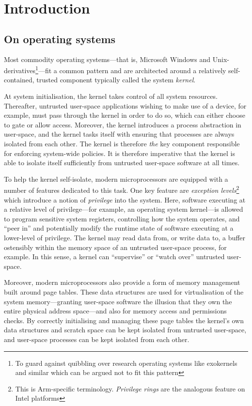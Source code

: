 \documentclass[a4paper, UKenglish, cleveref, autoref, thm-restate]{lipics-v2021}
\begin{document}
\section{Introduction}
\label{sect.introduction}

\subsection{On operating systems}

Most commodity operating systems---that is, Microsoft Windows and Unix-derivatives\footnote{To guard against quibbling over research operating systems like exokernels and similar which can be argued not to fit this pattern}---fit a common pattern and are architected around a relatively self-contained, trusted component typically called the system \emph{kernel}.

At system initialisation, the kernel takes control of all system resources.
Thereafter, untrusted user-space applications wishing to make use of a device, for example, must pass through the kernel in order to do so, which can either choose to gate or allow access.
Moreover, the kernel introduces a process abstraction in user-space, and the kernel tasks itself with ensuring that processes are always isolated from each other.
The kernel is therefore \emph{the} key component responsible for enforcing system-wide policies.
It is therefore imperative that the kernel is able to isolate itself sufficiently from untrusted user-space software at all times.

To help the kernel self-isolate, modern microprocessors are equipped with a number of features dedicated to this task.
One key feature are \emph{exception levels}\footnote{This is Arm-specific terminology.  \emph{Privilege rings} are the analogous feature on Intel platforms} which introduce a notion of \emph{privilege} into the system.
Here, software executing at a relative level of privilege---for example, an operating system kernel---is allowed to program sensitive system registers, controlling how the system operates, and ``peer in'' and potentially modify the runtime state of software executing at a lower-level of privilege.
The kernel may read data from, or write data to, a buffer ostensibly within the memory space of an untrusted user-space process, for example.
In this sense, a kernel can ``supervise'' or ``watch over'' untrusted user-space.

Moreover, modern microprocessors also provide a form of memory management built around page tables.
These data structures are used for virtualisation of the system memory---granting user-space software the illusion that they own the entire physical address space---and also for memory access and permissions checks.
By correctly initialising and managing these page tables the kernel's own data structures and scratch space can be kept isolated from untrusted user-space, and user-space processes can be kept isolated from each other.
\end{document}
